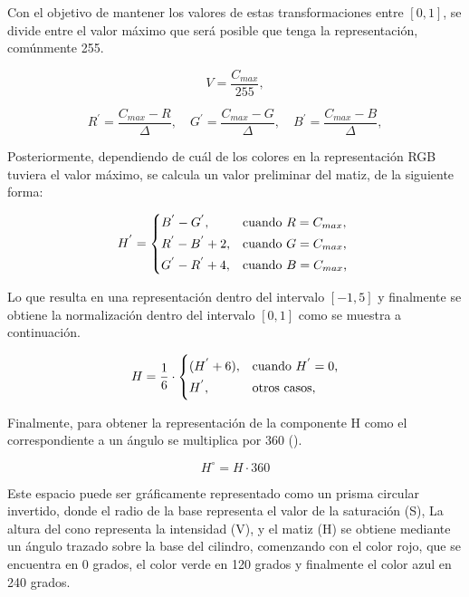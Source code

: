 Con el objetivo de mantener los valores de estas transformaciones entre $[0,1]$, se divide entre el valor máximo que será posible que tenga la representación, comúnmente 255.

\begin{equation}
V = \frac{C_{max}}{255},
\label{eqn:Value}
\end{equation}

\begin{equation}
R^{'} = \frac{C_{max}-R}{\Delta},  \quad G^{'} = \frac{C_{max}-G}{\Delta},  \quad B^{'} = \frac{C_{max}-B}{\Delta},
\label{eqn:R_prima}
\end{equation}

Posteriormente, dependiendo de cuál de los colores en la representación RGB tuviera el valor máximo, se calcula un valor preliminar del matiz, de la siguiente forma:

\begin{equation}
    H^{'} = \begin{cases*}
  B^{'} - G^{'}, & cuando $R = C_{max}$,\\
  R^{'} - B^{'}+2, & cuando $G = C_{max}$,\\
  G^{'} - R^{'}+4, & cuando $B = C_{max}$,
    \end{cases*}
\label{eqn:H_prima}
\end{equation}

Lo que resulta en una representación dentro del intervalo $[-1,5]$ y finalmente se obtiene la normalización dentro del intervalo $[0,1]$ como se muestra a continuación.

\begin{equation}
    H = \frac{1}{6}\cdot\begin{cases*}
  (H^{'}+6), & cuando $H^{'}=0$,\\
  H^{'}, & otros casos,
    \end{cases*}
    \label{eqn:H_normalizada}
\end{equation}

Finalmente, para obtener la representación de la componente H como el correspondiente a un ángulo se multiplica por 360 (\cite{freire_importancia_2007}).

\begin{equation}
    H^{\circ} = H\cdot360
    \label{eqn:H_degrees}
\end{equation} 

Este espacio puede ser gráficamente representado como un prisma circular invertido, donde el radio de la base representa el valor de la saturación (S), La altura del cono representa la intensidad (V), y el matiz (H) se obtiene mediante un ángulo trazado sobre la base del cilindro, comenzando con el color rojo, que se encuentra en 0 grados, el color verde en 120 grados y finalmente el color azul en 240 grados. 

